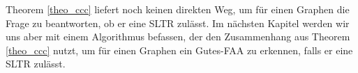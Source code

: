 Theorem \ref{theo_ccc} liefert noch keinen direkten Weg, um für einen Graphen die Frage zu beantworten, ob er eine SLTR zulässt. Im nächsten Kapitel werden wir uns aber mit einem Algorithmus befassen, der den Zusammenhang aus Theorem \ref{theo_ccc} nutzt, um für einen Graphen ein Gutes-FAA zu erkennen, falls er eine SLTR zulässt.





